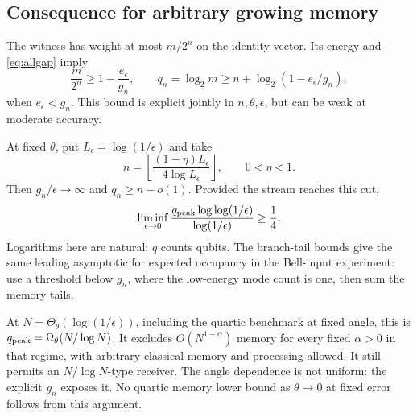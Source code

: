 \subsection{Consequence for arbitrary growing memory}
The witness has weight at most $m/2^n$ on the identity vector. Its energy and \eqref{eq:allgap} imply
\begin{equation}
 \frac m{2^n}\ge1-\frac{e_\epsilon}{g_n},\qquad
 q_n=\log_2m\ge n+\log_2(1-e_\epsilon/g_n),\label{eq:finiteq}
\end{equation}
when $e_\epsilon<g_n$. This bound is explicit jointly in $n,\theta,\epsilon$, but can be weak at moderate accuracy.

At fixed $\theta$, put $L_\epsilon=\log(1/\epsilon)$ and take
\[
 n=\left\lfloor\frac{(1-\eta)L_\epsilon}{4\log L_\epsilon}\right\rfloor,\qquad0<\eta<1.
\]
Then $g_n/\epsilon\to\infty$ and $q_n\ge n-o(1)$. Provided the stream reaches this cut,
\begin{equation}
 \liminf_{\epsilon\to0}\frac{q_{\rm peak}\log\log(1/\epsilon)}{\log(1/\epsilon)}\ge\frac14.\label{eq:asymemory}
\end{equation}
Logarithms here are natural; $q$ counts qubits. The branch-tail bounds give the same leading asymptotic for expected occupancy in the Bell-input experiment: use a threshold below $g_n$, where the low-energy mode count is one, then sum the memory tails.

At $N=\Theta_\theta(\log(1/\epsilon))$, including the quartic benchmark at fixed angle, this is $q_{\rm peak}=\Omega_\theta(N/\log N)$. It excludes $O(N^{1-\alpha})$ memory for every fixed $\alpha>0$ in that regime, with arbitrary classical memory and processing allowed. It still permits an $N/\log N$-type receiver. The angle dependence is not uniform: the explicit $g_n$ exposes it. No quartic memory lower bound as $\theta\to0$ at fixed error follows from this argument.
